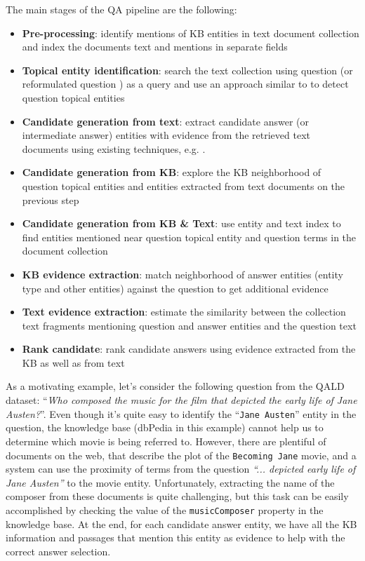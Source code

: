 The main stages of the QA pipeline are the following:
\begin{itemize}
\setlength\itemsep{0em}
\item \textbf{Pre-processing}: identify mentions of KB entities in text document collection and index the documents text and mentions in separate fields
\item \textbf{Topical entity identification}: search the text collection using question (or reformulated question \cite{AgichteinLG01}) as a query and use an approach similar to \cite{cornolti2014smaph} to detect question topical entities
\item \textbf{Candidate generation from text}: extract candidate answer (or intermediate answer) entities with evidence from the retrieved text documents using existing techniques, e.g. \cite{tsai2015web}.
\item \textbf{Candidate generation from KB}: explore the KB neighborhood of question topical entities and entities extracted from text documents on the previous step
\item \textbf{Candidate generation from KB \& Text}: use entity and text index to find entities mentioned near question topical entity and question terms in the document collection
\item \textbf{KB evidence extraction}: match neighborhood of answer entities (entity type and other entities) against the question to get additional evidence
\item \textbf{Text evidence extraction}: estimate the similarity between the collection text fragments mentioning question and answer entities and the question text
\item \textbf{Rank candidate}: rank candidate answers using evidence extracted from the KB as well as from text
\end{itemize}

As a motivating example, let's consider the following question from the QALD dataset: ``\textit{Who composed the music for the film that depicted the early life of Jane Austen?}''.
Even though it's quite easy to identify the ``\texttt{Jane Austen}'' entity in the question, the knowledge base (dbPedia in this example) cannot help us to determine which movie is being referred to.
However, there are plentiful of documents on the web, that describe the plot of the \texttt{Becoming Jane} movie, and a system can use the proximity of terms from the question \textit{``... depicted early life of Jane Austen''} to the movie entity.
Unfortunately, extracting the name of the composer from these documents is quite challenging, but this task can be easily accomplished by checking the value of the \texttt{musicComposer} property in the knowledge base.
At the end, for each candidate answer entity, we have all the KB information and passages that mention this entity as evidence to help with the correct answer selection.


